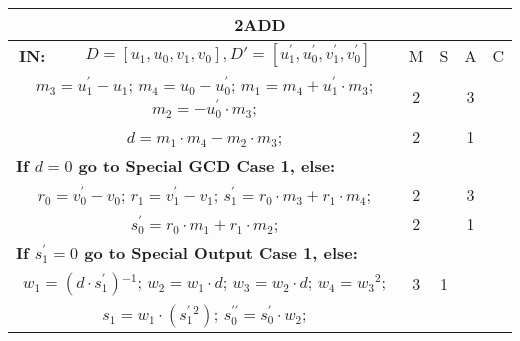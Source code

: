 \begin{tabular}{|c|cr|c|c|c|c|}
\hline
\multicolumn{7}{|c|}{\bf{2ADD}} \TS \\
\hline
\bf{IN:} &\multicolumn{2}{|c|}{$D = [u_{1},u_{0},v_{1},v_{0}], D' = [u^{\prime}_{1},u^{\prime}_{0},v^{\prime}_{1},v^{\prime}_{0}]$}
\TS & M & \hspace{1pt}S\hspace{1pt} & A & \hspace{1pt}C\hspace{1pt} \\
\hline
\multicolumn{3}{|R{340pt}|}{ 
$m_{3}=u^{\prime}_{1}-u_{1}$;\hspace{4pt}
$m_{4}=u_{0}-u^{\prime}_{0}$;\hspace{4pt}
$m_{1}=m_{4}+u^{\prime}_{1} \cdot m_{3}$;\hspace{4pt}
$m_{2}=-u^{\prime}_{0} \cdot m_{3}$;\hspace{4pt}
} & 2 &  & 3 & \\
\multicolumn{3}{|R{340pt}|}{ 
$d=m_{1} \cdot m_{4}-m_{2} \cdot m_{3}$;\hspace{4pt}
} & 2 &  & 1 & \\
\multicolumn{3}{|l|}{ 
 \bf{If $d = 0$ go to Special GCD Case 1, else:} } &  &  &  & \\
\multicolumn{3}{|R{340pt}|}{ 
$r_{0}=v^{\prime}_{0}-v_{0}$;\hspace{4pt}
$r_{1}=v^{\prime}_{1}-v_{1}$;\hspace{4pt}
$s^{\prime}_{1}=r_{0} \cdot m_{3}+r_{1} \cdot m_{4}$;\hspace{4pt}
} & 2 &  & 3 & \\
\multicolumn{3}{|R{340pt}|}{ 
$s^{\prime}_{0}=r_{0} \cdot m_{1}+r_{1} \cdot m_{2}$;\hspace{4pt}
} & 2 &  & 1 & \\
\multicolumn{3}{|l|}{ 
 \bf{If $s^{\prime}_{1} = 0$ go to Special Output Case 1, else:} } &  &  &  & \\
\multicolumn{3}{|R{340pt}|}{ 
$w_{1}=(d \cdot s^{\prime}_{1}){}^{-1}$;\hspace{4pt}
$w_{2}=w_{1} \cdot d$;\hspace{4pt}
$w_{3}=w_{2} \cdot d$;\hspace{4pt}
$w_{4}=w_{3}{}^{2}$;\hspace{4pt}
} & 3 & 1 &  & \\
\multicolumn{3}{|R{340pt}|}{ 
$s_{1}=w_{1} \cdot (s^{\prime}_{1}{}^{2})$;\hspace{4pt}
$s^{\prime\prime}_{0}=s^{\prime}_{0} \cdot w_{2}$;\hspace{4pt}
}
\end{tabular}
